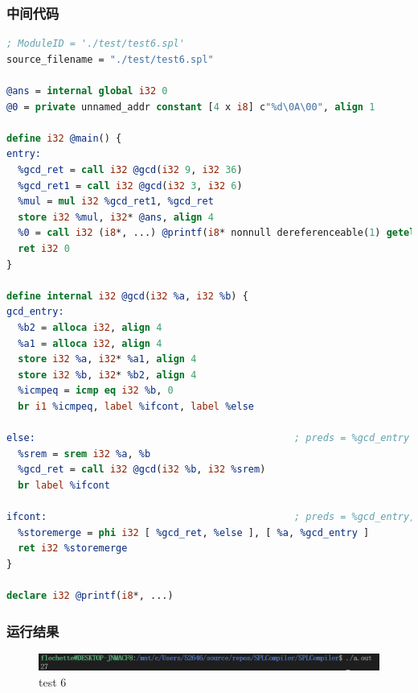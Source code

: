 \documentclass{article}
\begin{document}
\subsubsection{中间代码}
\begin{lstlisting}[language=LLVM]
; ModuleID = './test/test6.spl'
source_filename = "./test/test6.spl"

@ans = internal global i32 0
@0 = private unnamed_addr constant [4 x i8] c"%d\0A\00", align 1

define i32 @main() {
entry:
  %gcd_ret = call i32 @gcd(i32 9, i32 36)
  %gcd_ret1 = call i32 @gcd(i32 3, i32 6)
  %mul = mul i32 %gcd_ret1, %gcd_ret
  store i32 %mul, i32* @ans, align 4
  %0 = call i32 (i8*, ...) @printf(i8* nonnull dereferenceable(1) getelementptr inbounds ([4 x i8], [4 x i8]* @0, i64 0, i64 0), i32 %mul)
  ret i32 0
}

define internal i32 @gcd(i32 %a, i32 %b) {
gcd_entry:
  %b2 = alloca i32, align 4
  %a1 = alloca i32, align 4
  store i32 %a, i32* %a1, align 4
  store i32 %b, i32* %b2, align 4
  %icmpeq = icmp eq i32 %b, 0
  br i1 %icmpeq, label %ifcont, label %else

else:                                             ; preds = %gcd_entry
  %srem = srem i32 %a, %b
  %gcd_ret = call i32 @gcd(i32 %b, i32 %srem)
  br label %ifcont

ifcont:                                           ; preds = %gcd_entry, %else
  %storemerge = phi i32 [ %gcd_ret, %else ], [ %a, %gcd_entry ]
  ret i32 %storemerge
}

declare i32 @printf(i8*, ...)
\end{lstlisting}
\subsubsection{运行结果}
\begin{figure}[H]
    \centering
    \includegraphics[width=1\textwidth]{test6res.png}
    \caption{test 6}
\end{figure}
\end{document}
